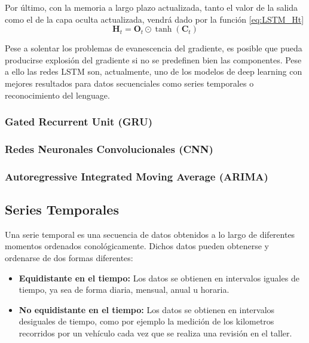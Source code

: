 \documentclass[a4paper,12pt]{article}
\begin{document}
Por último, con la memoria a largo plazo actualizada,
tanto el valor de la salida como el de la capa oculta 
actualizada, vendrá dado por la función \ref{eq:LSTM_Ht}
\begin{equation}
    \mathbf{H}_{t} = \mathbf{O}_{t} \odot \tanh(\mathbf{C}_{t})
\end{equation}

Pese a solentar los problemas de evanescencia del gradiente,
es posible que pueda producirse explosión del gradiente
si no se predefinen bien las componentes. Pese a ello 
las redes LSTM son, actualmente, uno de los modelos de 
deep learning con mejores resultados para datos secuenciales
como series temporales o reconocimiento del lenguage.

\subsubsection{Gated Recurrent Unit (GRU)}

\subsubsection{Redes Neuronales Convolucionales (CNN)}

\subsubsection{Autoregressive Integrated Moving Average (ARIMA)}

\subsection{Series Temporales}

Una serie temporal es una secuencia de datos obtenidos
a lo largo de diferentes momentos ordenados conológicamente.
Dichos datos pueden obtenerse y ordenarse de dos formas diferentes:

\begin{itemize}
    \item \textbf{Equidistante en el tiempo:} Los datos se 
    obtienen en intervalos iguales de tiempo, ya sea de forma
    diaria, mensual, anual u horaria.

    \item \textbf{No equidistante en el tiempo:} Los datos 
    se obtienen en intervalos desiguales de tiempo, como 
    por ejemplo la medición de los kilometros recorridos por 
    un vehículo cada vez que se realiza una revisión en el 
    taller.
\end{itemize}
\end{document}
